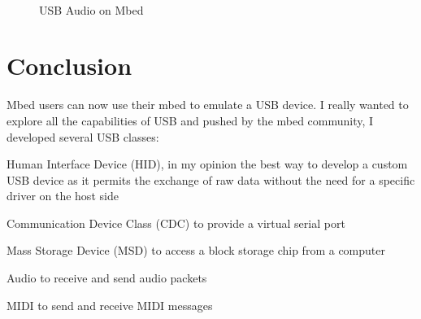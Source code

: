 \documentclass[pdftex,10pt,a4paper]{report}
\newenvironment{packed_item}{
\begin{itemize}
  \setlength{\itemsep}{1pt}
  \setlength{\parskip}{0pt}
  \setlength{\parsep}{0pt}
}{\end{itemize}}
\begin{document}
\begin{figure}[htp]
  \centering
   \\
  \caption{USB Audio on Mbed}
  \label{fig:contour}
\end{figure}
 
 

\section{Conclusion}
Mbed users can now use their mbed to emulate a USB device. I really wanted to explore all the capabilities of USB and pushed by the mbed community, I developed several USB classes:
\begin{packed_item}
	\item Human Interface Device (HID), in my opinion the best way to develop a custom USB device as it permits the exchange of raw data without the need for a specific driver on the host side
	\item Communication Device Class (CDC) to provide a virtual serial port
	\item Mass Storage Device (MSD) to access a block storage chip from a computer
	\item Audio to receive and send audio packets
	\item MIDI to send and receive MIDI messages
\end{packed_item}
\end{document}
